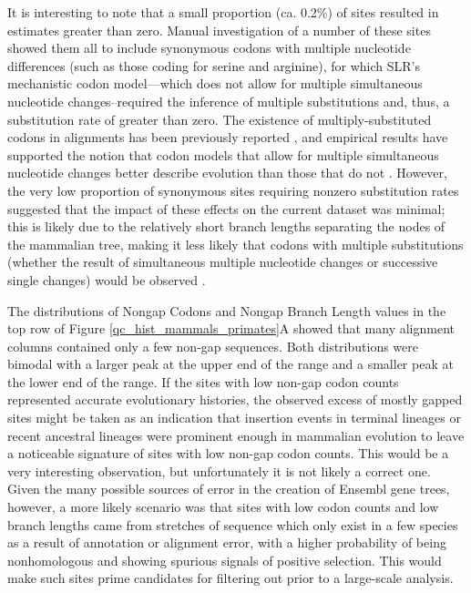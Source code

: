It is interesting to note that a small proportion (ca. 0.2\%) of \syn
sites resulted in \ml estimates greater than zero. Manual
investigation of a number of these sites   showed them
all to include synonymous codons with multiple nucleotide differences
(such as those coding for serine and arginine), for which SLR's
mechanistic codon model---which does not allow for multiple
simultaneous nucleotide changes--required the inference of multiple
\nsyn substitutions and, thus, a \nsyn substitution rate of greater
than zero. The existence of multiply-substituted codons in alignments
has been previously reported \citep{Averof2000,Whelan2004}, and
empirical results have supported the notion that codon models that
allow for multiple simultaneous nucleotide changes better describe
evolution than those that do not \citep{Kosiol2007}. However, the very
low proportion of synonymous sites requiring nonzero \nsyn
substitution rates suggested that the impact of these effects on the
current dataset was minimal; this is likely due to the relatively
short branch lengths separating the nodes of the mammalian tree,
making it less likely that codons with multiple substitutions (whether
the result of simultaneous multiple nucleotide changes or successive
single changes) would be observed \citep{Kosiol2007}.

The distributions of Nongap Codons and Nongap Branch Length values in
the top row of Figure \ref{qc_hist_mammals_primates}A showed that many
alignment columns contained only a few non-gap sequences. Both
distributions were bimodal with a larger peak at the upper end of the
range and a smaller peak at the lower end of the range. If the sites
with low non-gap codon counts represented accurate evolutionary
histories, the observed excess of mostly gapped sites might be taken
as an indication that insertion events in terminal lineages or recent
ancestral lineages were prominent enough in mammalian evolution to
leave a noticeable signature of sites with low non-gap codon
counts. This would be a very interesting observation, but
unfortunately it is not likely a correct one. Given the many possible
sources of error in the creation of Ensembl gene trees, however, a
more likely scenario was that sites with low codon counts and low
branch lengths came from stretches of sequence which only exist in a
few species as a result of annotation or alignment error, with a
higher probability of being nonhomologous and showing spurious signals
of positive selection. This would make such sites prime candidates for
filtering out prior to a large-scale analysis.

